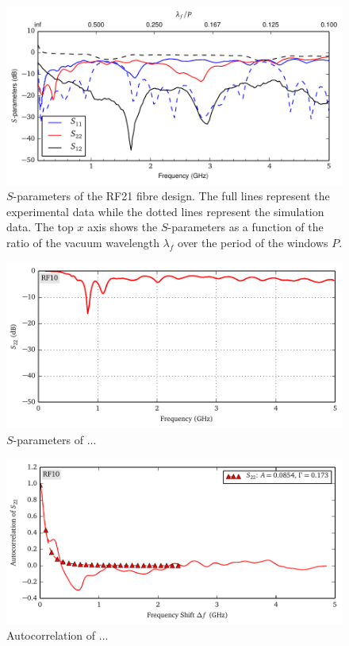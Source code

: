\begin{figure}
 \centering
 \includegraphics[width=\textwidth]{figs/active/sParametersRF21.pdf}
 \caption[$S$-parameters of the RF21 fibre design]{$S$-parameters of the RF21 fibre design. The full lines represent
	  the experimental data while the dotted lines represent the simulation data.
	  The top $x$ axis shows the $S$-parameters as a function of the ratio of the 
	  vacuum wavelength $\lambda_f$ over the period of the windows $P$.}
 \label{fig:antenna.sParameters}
\end{figure}


\begin{figure}
 \centering
 \includegraphics{figs/active/RF10-sParameters.pdf}
 \caption{$S$-parameters of ...}
\end{figure}

\begin{figure}
 \centering
 \includegraphics{figs/active/RF10-autoCorrelation.pdf}
 \caption{Autocorrelation of ...}
\end{figure}

